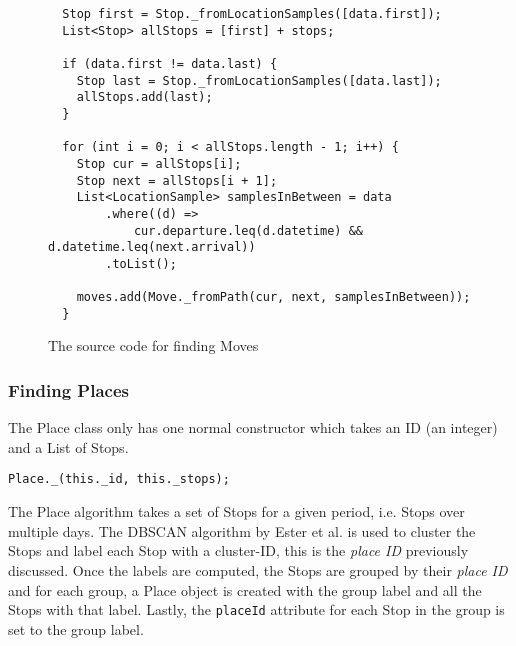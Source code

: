 \begin{figure}[h]
    \centering
    \begin{verbatim}
  Stop first = Stop._fromLocationSamples([data.first]);
  List<Stop> allStops = [first] + stops;

  if (data.first != data.last) {
    Stop last = Stop._fromLocationSamples([data.last]);
    allStops.add(last);
  }

  for (int i = 0; i < allStops.length - 1; i++) {
    Stop cur = allStops[i];
    Stop next = allStops[i + 1];
    List<LocationSample> samplesInBetween = data
        .where((d) =>
            cur.departure.leq(d.datetime) && d.datetime.leq(next.arrival))
        .toList();

    moves.add(Move._fromPath(cur, next, samplesInBetween));
  }
\end{verbatim}
    \caption{The source code for finding Moves}
    \label{fig:source-code-modes}
\end{figure}

\subsubsection*{Finding Places}
The Place class only has one normal constructor which takes an ID (an integer) and a List of Stops. 
\begin{verbatim}
Place._(this._id, this._stops);
\end{verbatim}

The Place algorithm takes a set of Stops for a given period, i.e. Stops over multiple days. The DBSCAN algorithm by Ester et al. \cite{density-based-1996} is used to cluster the Stops and label each Stop with a cluster-ID, this is the \textit{place ID} previously discussed. Once the labels are computed, the Stops are grouped by their \textit{place ID} and for each group, a Place object is created with the group label and all the Stops with that label. Lastly, the \verb|placeId| attribute for each Stop in the group is set to the group label.

